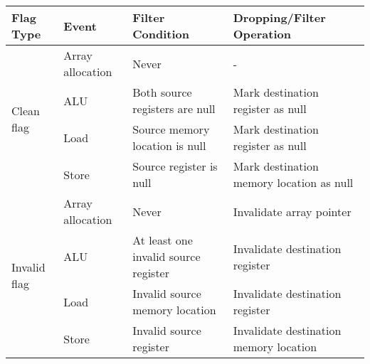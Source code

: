 

\begin{tabular}{|l|l|l|l|}
\hline

{\bf Flag Type} & {\bf Event} & {\bf Filter Condition} & {\bf Dropping/Filter Operation} \\ \hline \hline

\multirow{4}{*}{Clean flag}  
& Array allocation & Never & - \\ \cline{2-4}
& ALU   & Both source registers are null & Mark destination register as null \\ \cline{2-4}
& Load  & Source memory location is null & Mark destination register as null \\ \cline{2-4}
& Store & Source register is null & Mark destination memory location as null \\
\hline\hline

\multirow{4}{*}{Invalid flag}  
& Array allocation & Never & Invalidate array pointer \\ \cline{2-4}
& ALU   & At least one invalid source register & Invalidate destination register \\ \cline{2-4}
& Load  & Invalid source memory location & Invalidate destination register \\ \cline{2-4}
& Store & Invalid source register & Invalidate destination memory location \\
\hline%



% 


\end{tabular}
